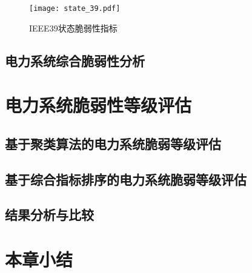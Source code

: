 \begin{table}[H]
\begin{tabular}{C{1.5cm}C{2.75cm}C{2.75cm}C{3.25cm}C{2.75cm}}
  \bottomrule
  \end{tabular}
\end{table}


\begin{figure}[H] %
  \centering
  \texttt{[image: state\_39.pdf]}
  \caption{IEEE39状态脆弱性指标}
  \label{fig:state_39}
\end{figure}



\subsection{电力系统综合脆弱性分析}
\label{sec:singleAnalysis}





\section{电力系统脆弱性等级评估}
\label{sec:multiAssessment}




\subsection{基于聚类算法的电力系统脆弱等级评估}
\label{sec:multiVSsingle}




\subsection{基于综合指标排序的电力系统脆弱等级评估}
\label{sec:multiAnalysis}





\subsection{结果分析与比较}




\section{本章小结}
\label{sec:sum5}


